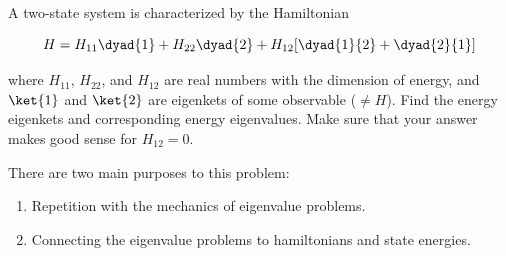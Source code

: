 \begin{question}

  A two-state system is characterized by the Hamiltonian

  \begin{equation*}
    H = H_{11} \dyad{1} + H_{22} \dyad{2} + H_{12}[\dyad{1}{2} + \dyad{2}{1}]
  \end{equation*}
  
  where $H_{11}$, $H_{22}$, and $H_{12}$ are real numbers with the
  dimension of energy, and $\ket{1}$ and $\ket{2}$ are eigenkets of
  some observable ($\ne H$). Find the energy eigenkets and
  corresponding energy eigenvalues. Make sure that your answer makes
  good sense for $H_{12} = 0$.

\end{question}

\begin{purpose}
  There are two main purposes to this problem:
  \begin{enumerate}

  \item Repetition with the mechanics of eigenvalue problems.

  \item Connecting the eigenvalue problems to hamiltonians and state
    energies.
  \end{enumerate}
\end{purpose}


